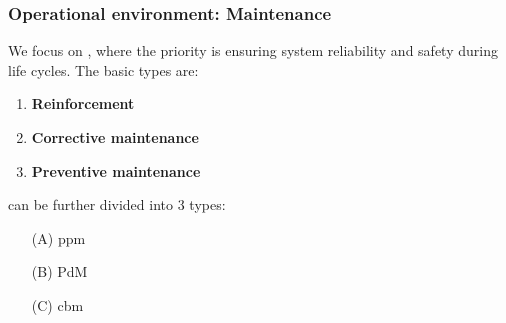 \begin{frame}
    \frametitle{Operational environment: Maintenance}
    \vspace*{\fill}
    We focus on , where the
    priority is ensuring system reliability and safety during life cycles.
    The basic types are: %
    \pause
    \begin{enumerate}
        \item \textbf{Reinforcement} %
        \item \textbf{Corrective maintenance} %
        \item \textbf{Preventive maintenance} %
    \end{enumerate}

    \pause
     can be further divided into 3 types:
    \pause
    \begin{enumerate}%
        \item[(A)] \acl{ppm} %
        \item[(B)] \acl{PdM} %
        \item[(C)] \acl{cbm} %
    \end{enumerate}

    \vspace*{\fill}
\end{frame}

